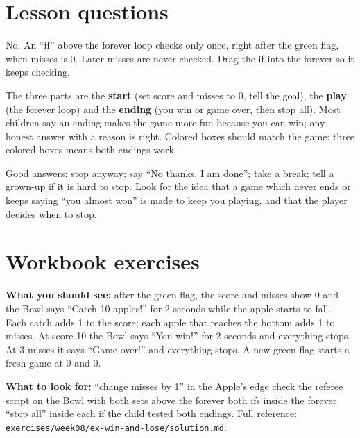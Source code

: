 
\section{Lesson questions}
\begin{answer}
No. An \enquote{if} above the forever loop checks only once, right after the green flag, when misses is 0. Later misses are never checked. Drag the if into the forever so it keeps checking.
\end{answer}

\begin{answer}[Reflection]
The three parts are the \textbf{start} (set score and misses to 0, tell the goal), the \textbf{play} (the forever loop) and the \textbf{ending} (you win or game over, then stop all). Most children say an ending makes the game more fun because you can win; any honest answer with a reason is right. Colored boxes should match the game: three colored boxes means both endings work.
\end{answer}

\begin{answer}
Good answers: stop anyway; say \enquote{No thanks, I am done}; take a break; tell a grown-up if it is hard to stop. Look for the idea that a game which never ends or keeps saying \enquote{you almost won} is made to keep you playing, and that the player decides when to stop.
\end{answer}

\section{Workbook exercises}
\begin{answer}
\textbf{What you should see:} after the green flag, the score and misses show 0 and the Bowl says \enquote{Catch 10 apples!} for 2 seconds while the apple starts to fall. Each catch adds 1 to the score; each apple that reaches the bottom adds 1 to misses. At score 10 the Bowl says \enquote{You win!} for 2 seconds and everything stops. At 3 misses it says \enquote{Game over!} and everything stops. A new green flag starts a fresh game at 0 and 0.

\textbf{What to look for:} \tickbox{} \enquote{change misses by 1} in the Apple's edge check \quad \tickbox{} the referee script on the Bowl with both sets above the forever \quad \tickbox{} both ifs inside the forever \quad \tickbox{} \enquote{stop all} inside each if \quad \tickbox{} the child tested both endings. Full reference: \texttt{exercises/week08/ex-win-and-lose/solution.md}.
\end{answer}

